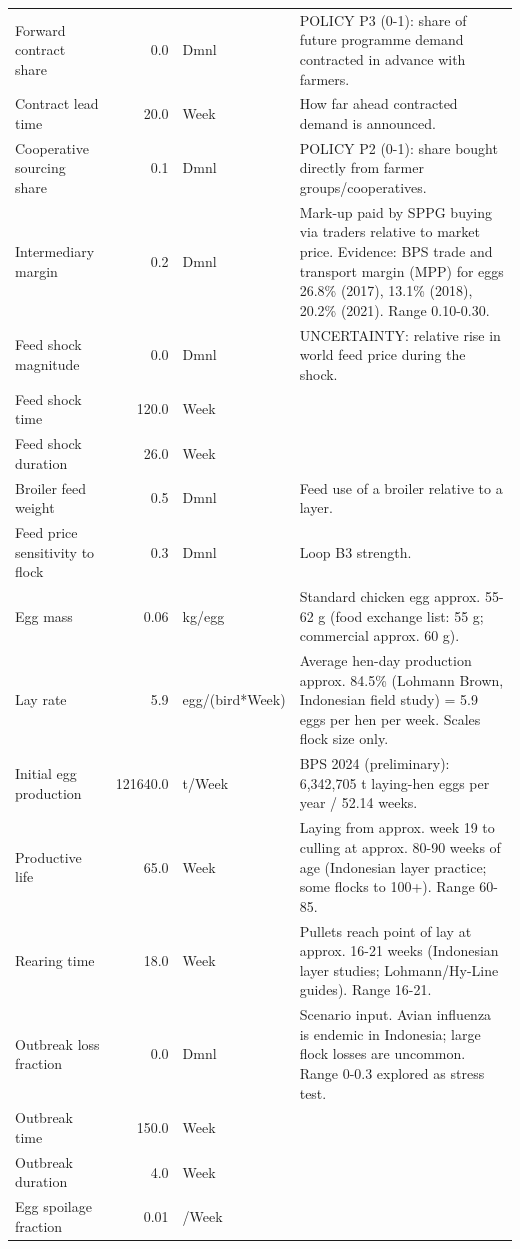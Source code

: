\documentclass[10pt,twocolumn,a4paper]{article}
\begin{document}
\begin{longtable}{>{\raggedright\arraybackslash}p{4.2cm}r>{\raggedright\arraybackslash}p{2.4cm}>{\raggedright\arraybackslash}p{7.2cm}}
Forward contract share & 0.0 & Dmnl & POLICY P3 (0-1): share of future programme demand contracted in advance with farmers. \\
Contract lead time & 20.0 & Week & How far ahead contracted demand is announced. \\
Cooperative sourcing share & 0.1 & Dmnl & POLICY P2 (0-1): share bought directly from farmer groups/cooperatives. \\
Intermediary margin & 0.2 & Dmnl & Mark-up paid by SPPG buying via traders relative to market price. Evidence: BPS trade and transport margin (MPP) for eggs 26.8\% (2017), 13.1\% (2018), 20.2\% (2021). Range 0.10-0.30. \\
Feed shock magnitude & 0.0 & Dmnl & UNCERTAINTY: relative rise in world feed price during the shock. \\
Feed shock time & 120.0 & Week &  \\
Feed shock duration & 26.0 & Week &  \\
Broiler feed weight & 0.5 & Dmnl & Feed use of a broiler relative to a layer. \\
Feed price sensitivity to flock & 0.3 & Dmnl & Loop B3 strength. \\
Egg mass & 0.06 & kg/egg & Standard chicken egg approx. 55-62 g (food exchange list: 55 g; commercial approx. 60 g). \\
Lay rate & 5.9 & egg/(bird*Week) & Average hen-day production approx. 84.5\% (Lohmann Brown, Indonesian field study) = 5.9 eggs per hen per week. Scales flock size only. \\
Initial egg production & 121640.0 & t/Week & BPS 2024 (preliminary): 6,342,705 t laying-hen eggs per year / 52.14 weeks. \\
Productive life & 65.0 & Week & Laying from approx. week 19 to culling at approx. 80-90 weeks of age (Indonesian layer practice; some flocks to 100+). Range 60-85. \\
Rearing time & 18.0 & Week & Pullets reach point of lay at approx. 16-21 weeks (Indonesian layer studies; Lohmann/Hy-Line guides). Range 16-21. \\
Outbreak loss fraction & 0.0 & Dmnl & Scenario input. Avian influenza is endemic in Indonesia; large flock losses are uncommon. Range 0-0.3 explored as stress test. \\
Outbreak time & 150.0 & Week &  \\
Outbreak duration & 4.0 & Week &  \\
Egg spoilage fraction & 0.01 & 1/Week &  \\

\end{longtable}
\end{document}
